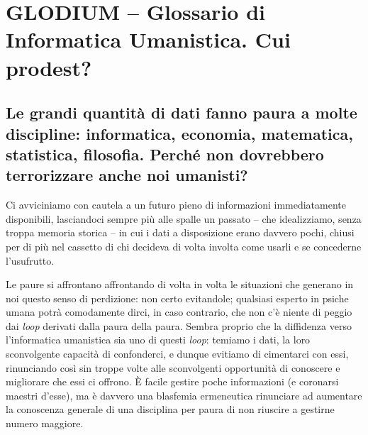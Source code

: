 \documentclass[
  b5paper,
  twoside,
  11pt,
  chapterprefix=false,
  bibliography=totocnumbered,
  parskip=0]{scrbook}
\begin{document}

\hypertarget{glodium-glossario-di-informatica-umanistica.-cui-prodest}{%
\section*{GLODIUM -- Glossario di Informatica Umanistica. Cui prodest?}\label{glodium-glossario-di-informatica-umanistica.-cui-prodest}}

\hypertarget{le-grandi-quantita-di-dati-fanno-paura-a-molte-discipline-informatica-economia-matematica-statistica-filosofia.-perche-non-dovrebbero-terrorizzare-anche-noi-umanisti}{%
\subsection*{Le grandi quantità di dati fanno paura a molte discipline: informatica, economia, matematica, statistica, filosofia. Perché non dovrebbero terrorizzare anche noi umanisti?}\label{le-grandi-quantita-di-dati-fanno-paura-a-molte-discipline-informatica-economia-matematica-statistica-filosofia.-perche-non-dovrebbero-terrorizzare-anche-noi-umanisti}}

Ci avviciniamo con cautela a un futuro pieno di informazioni
immediatamente disponibili, lasciandoci sempre più alle spalle un
passato -- che idealizziamo, senza troppa memoria storica -- in cui i
dati a disposizione erano davvero pochi, chiusi per di più nel cassetto
di chi decideva di volta involta come usarli e se concederne
l'usufrutto.

Le paure si affrontano affrontando di volta in volta le situazioni che
generano in noi questo senso di perdizione: non certo evitandole;
qualsiasi esperto in psiche umana potrà comodamente dirci, in caso
contrario, che non c'è niente di peggio dai \emph{loop} derivati dalla paura
della paura. Sembra proprio che la diffidenza verso l'informatica
umanistica sia uno di questi \emph{loop}: temiamo i dati, la loro
sconvolgente capacità di confonderci, e dunque evitiamo di cimentarci
con essi, rinunciando così sin troppe volte alle sconvolgenti
opportunità di conoscere e migliorare che essi ci offrono. È facile
gestire poche informazioni (e coronarsi maestri d'esse), ma è davvero
una blasfemia ermeneutica rinunciare ad aumentare la conoscenza generale
di una disciplina per paura di non riuscire a gestirne numero maggiore.
\end{document}
